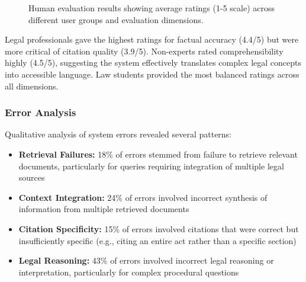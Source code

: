 \documentclass[conference]{IEEEtran}
\begin{document}
\begin{figure}[ht]
\centering
{}
\caption{Human evaluation results showing average ratings (1-5 scale) across different user groups and evaluation dimensions.}
\label{fig:human_eval}
\end{figure}

Legal professionals gave the highest ratings for factual accuracy (4.4/5) but were more critical of citation quality (3.9/5). Non-experts rated comprehensibility highly (4.5/5), suggesting the system effectively translates complex legal concepts into accessible language. Law students provided the most balanced ratings across all dimensions.

\subsubsection{Error Analysis}

Qualitative analysis of system errors revealed several patterns:

\begin{itemize}
    \item \textbf{Retrieval Failures:} 18\% of errors stemmed from failure to retrieve relevant documents, particularly for queries requiring integration of multiple legal sources
    \item \textbf{Context Integration:} 24\% of errors involved incorrect synthesis of information from multiple retrieved documents
    \item \textbf{Citation Specificity:} 15\% of errors involved citations that were correct but insufficiently specific (e.g., citing an entire act rather than a specific section)
    \item \textbf{Legal Reasoning:} 43\% of errors involved incorrect legal reasoning or interpretation, particularly for complex procedural questions
\end{itemize}
\end{document}
